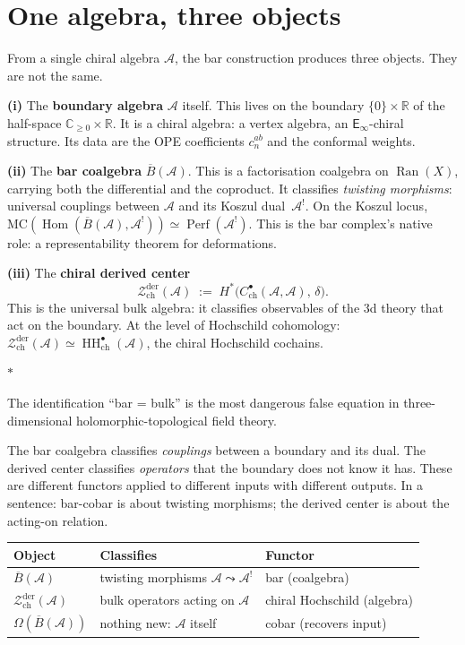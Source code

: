 \documentclass[11pt]{article}
\newcommand{\cA}{\mathcal{A}}
\newcommand{\cZ}{\mathcal{Z}}
\newcommand{\barB}{\overline{B}}
\newcommand{\C}{\mathbb{C}}
\newcommand{\R}{\mathbb{R}}
\newcommand{\Einf}{\mathsf{E}_{\infty}}
\newcommand{\Ran}{\operatorname{Ran}}
\newcommand{\MC}{\mathrm{MC}}
\newcommand{\Hom}{\operatorname{Hom}}
\newcommand{\HH}{\operatorname{HH}}
\newcommand{\Perf}{\operatorname{Perf}}
\newcommand{\Zder}{\cZ^{\mathrm{der}}_{\mathrm{ch}}}
\newcommand{\sep}{\bigskip\begin{center}$*$\end{center}\medskip}
\begin{document}
\section{One algebra, three objects}
\label{sec:three-objects}

From a single chiral algebra $\cA$, the bar construction
produces three objects.  They are not the same.

\medskip

\noindent
\textbf{(i)} The \textbf{boundary algebra} $\cA$ itself.  This
lives on the boundary $\{0\} \times \R$ of the half-space
$\C_{\geq 0} \times \R$.  It is a chiral algebra: a vertex
algebra, an $\Einf$-chiral structure.  Its data are the OPE
coefficients $c_n^{ab}$ and the conformal weights.

\medskip

\noindent
\textbf{(ii)} The \textbf{bar coalgebra} $\barB(\cA)$.  This is a
factorisation coalgebra on $\Ran(X)$, carrying both the
differential and the coproduct.  It classifies \textit{twisting
morphisms}: universal couplings between $\cA$ and its Koszul
dual~$\cA^!$.  On the Koszul locus,
$\MC(\Hom(\barB(\cA), \cA^!)) \simeq \Perf(\cA^!)$.  This is
the bar complex's native role: a representability theorem for
deformations.

\medskip

\noindent
\textbf{(iii)} The \textbf{chiral derived center}
\[
\Zder(\cA)
\;:=\;
H^*\bigl(C^\bullet_{\mathrm{ch}}(\cA, \cA),\, \delta\bigr).
\]
This is the universal bulk algebra: it classifies observables
of the $3$d theory that act on the boundary.  At the level of
Hochschild cohomology:
$\Zder(\cA) \simeq \HH^\bullet_{\mathrm{ch}}(\cA)$, the chiral
Hochschild cochains.

\sep

The identification ``bar = bulk'' is the most dangerous false
equation in three-dimensional holomorphic-topological field theory.

The bar coalgebra classifies \textit{couplings} between a boundary
and its dual.  The derived center classifies \textit{operators} that
the boundary does not know it has.  These are different functors
applied to different inputs with different outputs.  In a
sentence: bar-cobar is about twisting morphisms; the derived
center is about the acting-on relation.

\begin{center}
\small
\begin{tabular}{@{}lll@{}}
\textbf{Object} & \textbf{Classifies} & \textbf{Functor} \\
\hline
$\barB(\cA)$ & twisting morphisms $\cA \leadsto \cA^!$
  & bar (coalgebra) \\[3pt]
$\Zder(\cA)$ & bulk operators acting on $\cA$
  & chiral Hochschild (algebra) \\[3pt]
$\Omega(\barB(\cA))$ & nothing new: $\cA$ itself
  & cobar (recovers input)
\end{tabular}
\end{center}
\end{document}
